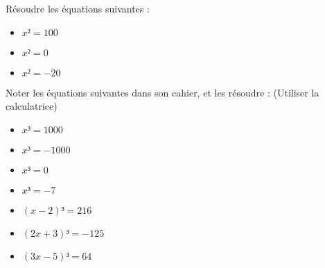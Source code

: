 \documentclass{beamer}
\begin{document}
\begin{frame}
	Résoudre les équations suivantes :
	\begin{itemize}
		\item $x² = 100$
		\item $x² = 0$
		\item $x² = -20$
	\end{itemize}
\end{frame}

\begin{frame}
	Noter les équations suivantes dans son cahier, et les résoudre : \onslide<2-> { (Utiliser la calculatrice) }
	\begin{multicols}{2}
		\begin{itemize}
			\item $x³ = 1000$
			\item $x³ = -1000$
			\item<2-> $x³ = 0$
			\item<2-> $x³ = -7$
			\item<2-> $(x - 2)³ = 216$
			\item<2-> $(2x + 3)³ = -125$
			\item<2-> $(3x - 5)³ = 64$
		\end{itemize}
	\end{multicols}
\end{frame}
\end{document}
